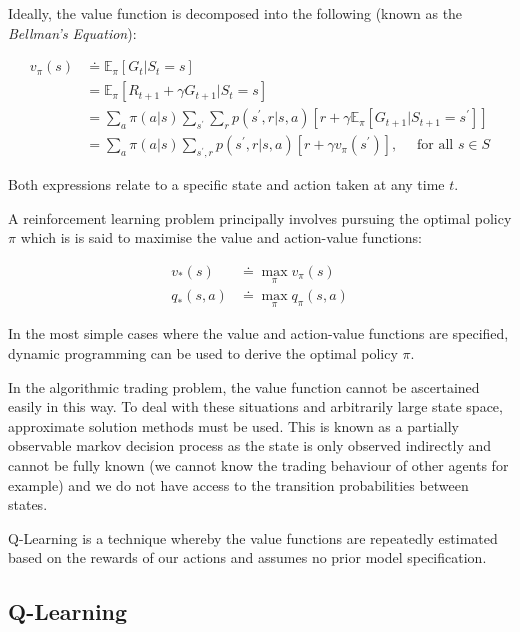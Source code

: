 \documentclass[12pt, authoryear]{elsarticle}
\begin{document}
Ideally, the value function is decomposed into the following (known as the \textit{Bellman's Equation}):

$$
\begin{aligned} v _ { \pi } ( s ) & \doteq \mathbb { E } _ { \pi } \left[ G _ { t } | S _ { t } = s \right] \\ & = \mathbb { E } _ { \pi } \left[ R _ { t + 1 } + \gamma G _ { t + 1 } | S _ { t } = s \right] \\ & = \sum _ { a } \pi ( a | s ) \sum _ { s ^ { \prime } } \sum _ { r } p \left( s ^ { \prime } , r | s , a \right) \left[ r + \gamma \mathbb { E } _ { \pi } \left[ G _ { t + 1 } | S _ { t + 1 } = s ^ { \prime } \right] \right] \\ & = \sum _ { a } \pi ( a | s ) \sum _ { s ^ { \prime } , r } p \left( s ^ { \prime } , r | s , a \right) \left[ r + \gamma v _ { \pi } \left( s ^ { \prime } \right) \right] , \quad \text { for all } s \in S \end{aligned}
$$

Both expressions relate to a specific state and action taken at any time $t$.

A reinforcement learning problem principally involves pursuing the optimal policy $\pi$ which is is said to maximise the value and action-value functions:

$$
\begin{aligned}
v _ { * } ( s ) &\doteq \max _ { \pi } v _ { \pi } ( s )\\
q _ { * } ( s , a ) &\doteq \max _ { \pi } q _ { \pi } ( s , a )
\end{aligned}
$$

In the most simple cases where the value and action-value functions are specified, dynamic programming can be used to derive the optimal policy $\pi$.


In the algorithmic trading problem, the value function cannot be ascertained easily in this way. To deal with these situations and arbitrarily large state space, approximate solution methods must be used. This is known as a partially observable markov decision process as the state is only observed indirectly and cannot be fully known (we cannot know the trading behaviour of other agents for example) and we do not have access to the transition probabilities between states.

Q-Learning is a technique whereby the value functions are repeatedly estimated based on the rewards of our actions and assumes no prior model specification.

\subsection{Q-Learning} 
\end{document}
